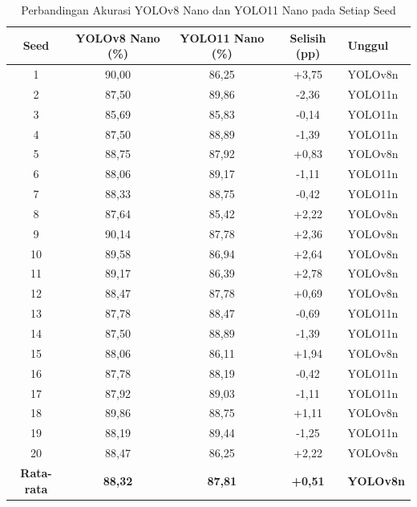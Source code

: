 \begin{sectioncontent}
\begin{subsectioncontent}
        \begin{table}[H]
            \centering
            \caption{Perbandingan Akurasi YOLOv8 Nano dan YOLO11 Nano pada Setiap Seed}
            \label{tab:perbandingan-akurasi-seed}
            \small
            \renewcommand{\arraystretch}{1.2}
            \begin{tabularx}{\textwidth}{|c|c|c|c|>{\centering\arraybackslash}X|}
                \hline
                \textbf{Seed} & \textbf{YOLOv8 Nano (\%)} & \textbf{YOLO11 Nano (\%)} & \textbf{Selisih (pp)} & \textbf{Unggul} \\
                \hline
                1 & 90,00 & 86,25 & +3,75 & YOLOv8n \\
                2 & 87,50 & 89,86 & -2,36 & YOLO11n \\
                3 & 85,69 & 85,83 & -0,14 & YOLO11n \\
                4 & 87,50 & 88,89 & -1,39 & YOLO11n \\
                5 & 88,75 & 87,92 & +0,83 & YOLOv8n \\
                6 & 88,06 & 89,17 & -1,11 & YOLO11n \\
                7 & 88,33 & 88,75 & -0,42 & YOLO11n \\
                8 & 87,64 & 85,42 & +2,22 & YOLOv8n \\
                9 & 90,14 & 87,78 & +2,36 & YOLOv8n \\
                10 & 89,58 & 86,94 & +2,64 & YOLOv8n \\
                11 & 89,17 & 86,39 & +2,78 & YOLOv8n \\
                12 & 88,47 & 87,78 & +0,69 & YOLOv8n \\
                13 & 87,78 & 88,47 & -0,69 & YOLO11n \\
                14 & 87,50 & 88,89 & -1,39 & YOLO11n \\
                15 & 88,06 & 86,11 & +1,94 & YOLOv8n \\
                16 & 87,78 & 88,19 & -0,42 & YOLO11n \\
                17 & 87,92 & 89,03 & -1,11 & YOLO11n \\
                18 & 89,86 & 88,75 & +1,11 & YOLOv8n \\
                19 & 88,19 & 89,44 & -1,25 & YOLO11n \\
                20 & 88,47 & 86,25 & +2,22 & YOLOv8n \\
                \hline
                \textbf{Rata-rata} & \textbf{88,32} & \textbf{87,81} & \textbf{+0,51} & \textbf{YOLOv8n} \\
                \hline
            \end{tabularx}
        \end{table}


\end{subsectioncontent}
\end{sectioncontent}
